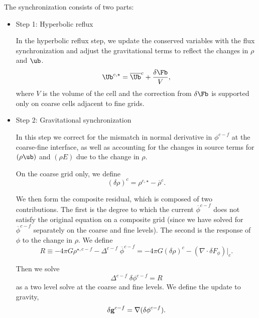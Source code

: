 The synchronization consists of two parts: 

\begin{itemize}
\item Step 1:  Hyperbolic reflux

In the hyperbolic reflux step, we update the conserved variables with the flux synchronization
and adjust the gravitational terms to reflect the changes in $\rho$ and $\ub$.
\begin{equation}
{\Ub}^{c, \star} = \overline{\Ub}^{c} + \frac{\delta\Fb}{V},
\end{equation}
where $V$ is the volume of the cell and the correction from $\delta\Fb$ is supported only on coarse cells adjacent to fine grids.   

\item Step 2:  Gravitational synchronization

In this step we correct for the mismatch in normal derivative in $\phi^{c-f}$ at the coarse-fine
interface, as well as accounting for the changes in source terms for $(\rho \ub)$
and $(\rho E)$ due to the change in $\rho.$

On the coarse grid only, we define
\begin{equation}
(\delta \rho)^{c} =  \rho^{c, \star} - {\overline{\rho}}^{c}  .
\end{equation}

We then form the composite residual, which is composed of two contributions.
The first is the degree to which the current $ \overline{\phi}^{c-f}$
does not satisfy the original equation on a composite grid (since we have solved for 
$\overline{\phi}^{c-f}$ separately on the coarse and fine levels).  The second
is the response of $\phi$ to the change in $\rho.$
We define 
\begin{equation} R \equiv  - 4 \pi G \rho^{\star,c-f} - \Delta^{c-f} \; \overline{\phi}^{c-f} 
= - 4 \pi G (\delta \rho)^c - (\nabla \cdot \delta F_\phi ) |_c   .
\end{equation}

Then we solve
\begin{equation}
 \Delta^{c-f} \; \delta \phi^{c-f} = R
\label{eq:gravsync}
\end{equation}
as a two level solve at the coarse and fine levels.  
We define the update to gravity,
\begin{equation}
\delta {\bf g}^{c-f} = \nabla (\delta \phi^{c-f})  .
\end{equation}


\end{itemize}
